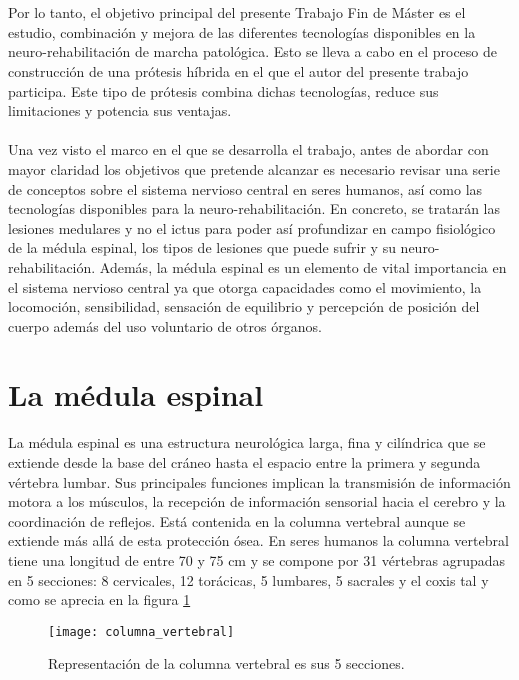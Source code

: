 \\
\\
Por lo tanto, el objetivo principal del presente Trabajo Fin de Máster es el estudio, combinación y mejora de las diferentes tecnologías disponibles en la neuro-rehabilitación de marcha patológica. Esto se lleva a cabo en el proceso de construcción de una prótesis híbrida en el que el autor del presente trabajo participa. Este tipo de prótesis combina dichas tecnologías, reduce sus limitaciones y potencia sus ventajas.
\\
\\
Una vez visto el marco en el que se desarrolla el trabajo, antes de abordar con mayor claridad los objetivos que pretende alcanzar es necesario revisar una serie de conceptos sobre el sistema nervioso central en seres humanos, así como las tecnologías disponibles para la neuro-rehabilitación. En concreto, se tratarán las lesiones medulares y no el ictus para poder así profundizar en campo fisiológico de la médula espinal, los tipos de lesiones que puede sufrir y su neuro-rehabilitación. Además, la médula espinal es un elemento de vital importancia en el sistema nervioso central ya que otorga capacidades como el movimiento, la locomoción, sensibilidad, sensación de equilibrio y percepción de posición del cuerpo además del uso voluntario de otros órganos.

\section{La médula espinal}
La médula espinal es una estructura neurológica larga, fina y cilíndrica que se extiende desde la base del cráneo hasta el espacio entre la primera y segunda vértebra lumbar\cite{anatomia_medula_1}\cite{anatomia_medula_2}. Sus principales funciones implican la transmisión de información motora a los músculos, la recepción de información sensorial hacia el cerebro y la coordinación de reflejos. Está contenida en la columna vertebral aunque se extiende más allá de esta protección ósea. En seres humanos la columna vertebral tiene una longitud de entre 70 y 75 cm y se compone por 31 vértebras agrupadas en 5 secciones: 8 cervicales, 12 torácicas, 5 lumbares, 5 sacrales y el coxis tal y como se aprecia en la figura \ref{fig:columna_vertebral}\\

\begin{figure}[!htb]
\centering
\texttt{[image: columna\_vertebral]}
  \caption{Representación de la columna vertebral es sus 5 secciones\cite{columna_vertebral}.}\label{fig:columna_vertebral}
\end{figure}

